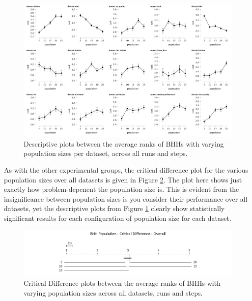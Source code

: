 \begin{figure}[htbp]
	\centering
	\includegraphics[width=\textwidth]{analysis/bhh_population/figures/descriptive/descriptive.png}
	\caption{Descriptive plots between the average ranks of \Acsp{BHH} with varying population sizes per dataset, across all runs and steps.}
	\label{fig:results:population:descriptive:descriptive}
\end{figure}

As with the other experimental groups, the critical difference plot for the various population sizes over all datasets is given in Figure \ref{fig:results:population:descriptive:cd}. The plot here shows just exactly how problem-depenent the population size is. This is evident from the insignificance between population sizes is you consider their performance over all datasets, yet the descriptive plots from Figure \ref{fig:results:population:descriptive:descriptive} clearly show statistically significant results for each configuration of population size for each dataset.

\begin{figure}[htbp]
	\centering
	\includegraphics[width=\textwidth]{analysis/bhh_population/figures/cd/overall.png}
	\caption{Critical Difference plots between the average ranks of \Acsp{BHH} with varying population sizes across all datasets, runs and steps.}
	\label{fig:results:population:descriptive:cd}
\end{figure}

